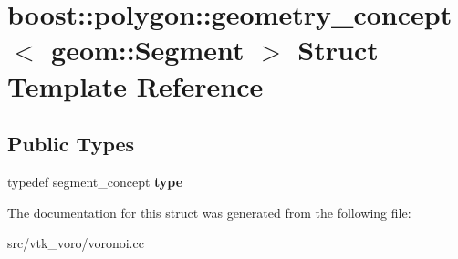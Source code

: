 \hypertarget{structboost_1_1polygon_1_1geometry__concept_3_01geom_1_1Segment_01_4}{}\section{boost\+:\+:polygon\+:\+:geometry\+\_\+concept$<$ geom\+:\+:Segment $>$ Struct Template Reference}
\label{structboost_1_1polygon_1_1geometry__concept_3_01geom_1_1Segment_01_4}
\subsection*{Public Types}
\begin{DoxyCompactItemize}
\item 
typedef segment\+\_\+concept {\bfseries type}\hypertarget{structboost_1_1polygon_1_1geometry__concept_3_01geom_1_1Segment_01_4_ab402edc5f03af89cffe2914162086dcd}{}\label{structboost_1_1polygon_1_1geometry__concept_3_01geom_1_1Segment_01_4_ab402edc5f03af89cffe2914162086dcd}

\end{DoxyCompactItemize}


The documentation for this struct was generated from the following file\+:\begin{DoxyCompactItemize}
\item 
src/vtk\+\_\+voro/voronoi.\+cc\end{DoxyCompactItemize}

